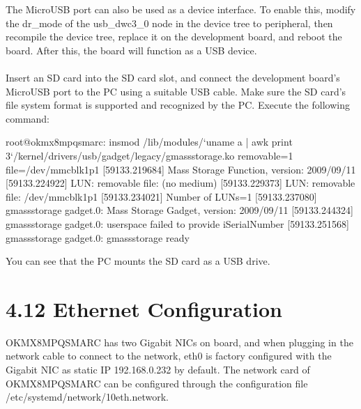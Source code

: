 \documentclass[letterpaper,10pt,openany,english]{sphinxmanual}
\begin{document}
\sphinxAtStartPar
{}

\sphinxAtStartPar
The Micro\sphinxhyphen{}USB port can also be used as a device interface. To enable this, modify the dr\_mode of the usb\_dwc3\_0 node in the device tree to peripheral, then recompile the device tree, replace it on the development board, and reboot the board. After this, the board will function as a USB device.\\
\\
Insert an SD card into the SD card slot, and connect the development board’s Micro\sphinxhyphen{}USB port to the PC using a suitable USB cable. Make sure the SD card’s file system format is supported and recognized by the PC. Execute the following command:

\begin{sphinxVerbatim}[commandchars=\\\{\}]
root@ok\PYGZhy{}mx8mpq\PYGZhy{}smarc:\PYGZti{}\PYGZsh{} insmod /lib/modules/`uname \PYGZhy{}a | awk \PYGZsq{}\PYGZob{}print \PYGZbs{}
\PYGZdl{}3\PYGZcb{}\PYGZsq{}`/kernel/drivers/usb/gadget/legacy/g\PYGZus{}mass\PYGZus{}storage.ko removable=1 file=/dev/mmcblk1p1
[59133.219684] Mass Storage Function, version: 2009/09/11
[59133.224922] LUN: removable file: (no medium)
[59133.229373] LUN: removable file: /dev/mmcblk1p1
[59133.234021] Number of LUNs=1
[59133.237080] g\PYGZus{}mass\PYGZus{}storage gadget.0: Mass Storage Gadget, version: 2009/09/11
[59133.244324] g\PYGZus{}mass\PYGZus{}storage gadget.0: userspace failed to provide iSerialNumber
[59133.251568] g\PYGZus{}mass\PYGZus{}storage gadget.0: g\PYGZus{}mass\PYGZus{}storage ready
\end{sphinxVerbatim}

\sphinxAtStartPar
You can see that the PC mounts the SD card as a USB drive.


\section{4.12 Ethernet Configuration}
\label{\detokenize{linux-manual:ethernet-configuration}}
\sphinxAtStartPar
OK\sphinxhyphen{}MX8MPQ\sphinxhyphen{}SMARC has two Gigabit NICs on board, and when plugging in the network cable to connect to the network, eth0 is factory configured with the Gigabit NIC as static IP 192.168.0.232 by default. The network card of OK\sphinxhyphen{}MX8MPQ\sphinxhyphen{}SMARC can be configured through the configuration file /etc/systemd/network/10\sphinxhyphen{}eth.network.\\
\end{document}
